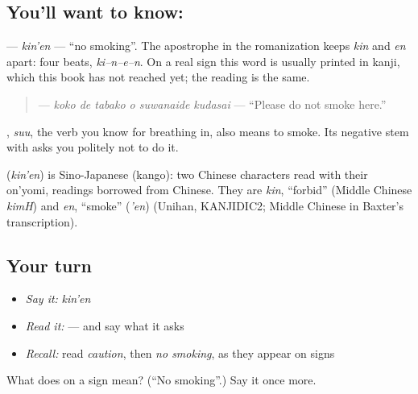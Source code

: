 \subsection*{You'll want to know: }
\textbf{} — \emph{kin'en} — \textquotedblleft{}no smoking\textquotedblright{}. The apostrophe in the romanization keeps \emph{kin} and \emph{en} apart: four beats, \emph{ki–n–e–n}. On a real sign this word is usually printed in kanji, which this book has not reached yet; the reading is the same.

\begin{quote}
\textbf{}
\end{quote}

\begin{quote}
\textbf{   } — \emph{koko de tabako o suwanaide kudasai} — \textquotedblleft{}Please do not smoke here.\textquotedblright{}
\end{quote}

\textbf{}, \emph{suu}, the verb you know for breathing in, also means to smoke. Its negative stem \textbf{} with \textbf{ } asks you politely not to do it.

\begin{cousinweb}
\textbf{} (\emph{kin'en}) is Sino-Japanese (kango): two Chinese characters read with their on'yomi, readings borrowed from Chinese. They are \emph{kin}, \textquotedblleft{}forbid\textquotedblright{} (Middle Chinese \emph{kimH}) and \emph{en}, \textquotedblleft{}smoke\textquotedblright{} (\emph{'en}) (Unihan, KANJIDIC2; Middle Chinese in Baxter's transcription).
\end{cousinweb}

\subsection*{Your turn}
\begin{itemize}
\raggedright
  \item \emph{Say it:} \emph{kin'en}
  \item \emph{Read it:} \textbf{   } — and say what it asks
  \item \emph{Recall:} read \emph{caution}, then \emph{no smoking}, as they appear on signs
\end{itemize}

\begin{tcolorbox}[breakable,colback=teal!4,colframe=teal!35!black,title={Before you move on}]
What does  on a sign mean? (\textquotedblleft{}No smoking\textquotedblright{}.) Say it once more.
\end{tcolorbox}
